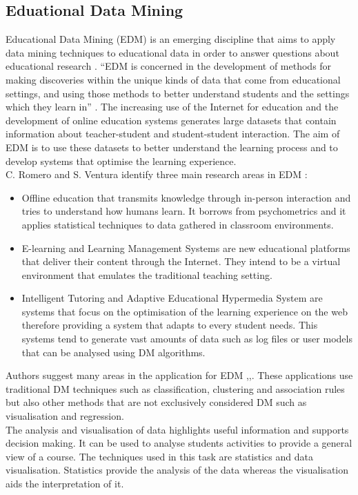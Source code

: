 \documentclass[11pt, oneside]{article}   	%
\begin{document}
\subsection{Eduational Data Mining}
Educational Data Mining (EDM) is an emerging discipline that aims to apply data mining techniques to educational data in order to answer questions about educational research \cite{EDM}.
``EDM is concerned in the development of methods for making discoveries within the unique kinds of data that come from educational settings, and using those methods to better understand students and the settings which they learn in'' \cite{Baker2010}. The increasing use of the Internet for education and the development of online education systems generates large datasets that contain information about teacher-student and student-student interaction. The aim of EDM is to use these datasets to better understand the learning process and to develop systems that optimise the learning experience.\\
C. Romero and S. Ventura identify three main research areas in EDM \cite{Romero2010}:
\begin{itemize}
	\item Offline education that transmits knowledge through in-person interaction and tries to understand how humans learn. It borrows from psychometrics and it applies statistical techniques to data gathered in classroom environments. 
	\item E-learning and Learning Management Systems are new educational platforms that deliver their content through the Internet. They intend to be a virtual environment that emulates the traditional teaching setting.
	\item Intelligent Tutoring and Adaptive Educational Hypermedia System are systems that focus on the optimisation of the learning experience on the web therefore providing a system that adapts to every student needs. This systems tend to generate vast amounts of data such as log files or user models that can be analysed using DM algorithms.
\end{itemize}
Authors suggest many areas in the application for EDM \cite{Castro2007},\cite{Baker2010},\cite{Romero2010}. These applications use traditional DM techniques such as classification, clustering and association rules but also other methods that are not exclusively considered DM such as visualisation and regression.\\
The analysis and visualisation of data highlights useful information and supports decision making. It can be used to analyse students activities to provide a general view of a course. The techniques used in this task are statistics and data visualisation. Statistics provide the analysis of the data whereas the visualisation aids the interpretation of it.\\
\end{document}
